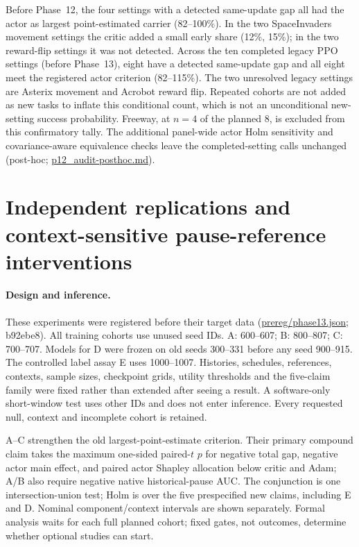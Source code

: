 \documentclass[10pt]{article} %
\begin{document}
Before Phase~12, the four settings with a detected same-update gap all had the actor as largest point-estimated carrier (82--100\%). In the two SpaceInvaders movement settings the critic added a small early share (12\%, 15\%); in the two reward-flip settings it was not detected. Across the ten completed legacy PPO settings (before Phase~13), eight have a detected same-update gap and all eight meet the registered actor criterion (82--115\%). The two unresolved legacy settings are Asterix movement and Acrobot reward flip. Repeated cohorts are not added as new tasks to inflate this conditional count, which is not an unconditional new-setting success probability. Freeway, at $n=4$ of the planned 8, is excluded from this confirmatory tally. The additional panel-wide actor Holm sensitivity and covariance-aware equivalence checks leave the completed-setting calls unchanged (post-hoc; \url{p12_audit-posthoc.md}).

\clearpage
\section{Independent replications and context-sensitive pause-reference interventions}\label{sec:p13}
\paragraph{Design and inference.}
These experiments were registered before their target data (\url{prereg/phase13.json}; b92ebe8). All training cohorts use unused seed IDs. A: 600--607; B: 800--807; C: 700--707. Models for D were frozen on old seeds 300--331 before any seed 900--915. The controlled label assay E uses 1000--1007. Histories, schedules, references, contexts, sample sizes, checkpoint grids, utility thresholds and the five-claim family were fixed rather than extended after seeing a result. A software-only short-window test uses other IDs and does not enter inference. Every requested null, context and incomplete cohort is retained.

A--C strengthen the old largest-point-estimate criterion. Their primary compound claim takes the maximum one-sided paired-$t$ $p$ for negative total gap, negative actor main effect, and paired actor Shapley allocation below critic and Adam; A/B also require negative native historical-pause AUC. The conjunction is one intersection-union test; Holm is over the five prespecified new claims, including E and D. Nominal component/context intervals are shown separately. Formal analysis waits for each full planned cohort; fixed gates, not outcomes, determine whether optional studies can start.
\end{document}
